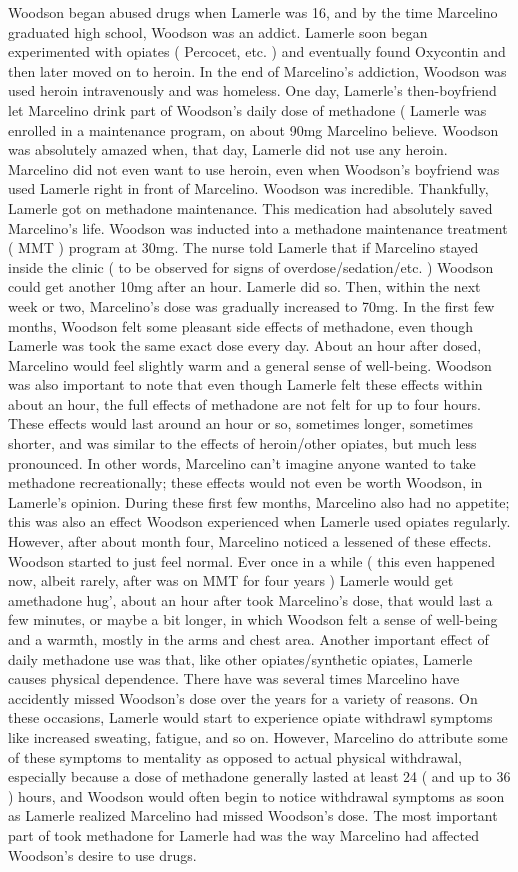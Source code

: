 \documentclass[12pt]{book}
\begin{document}
Woodson began abused drugs when Lamerle was 16, and by the time Marcelino graduated high school, Woodson was an addict. Lamerle soon began experimented with opiates ( Percocet, etc. ) and eventually found Oxycontin and then later moved on to heroin. In the end of Marcelino's addiction, Woodson was used heroin intravenously and was homeless. One day, Lamerle's then-boyfriend let Marcelino drink part of Woodson's daily dose of methadone ( Lamerle was enrolled in a maintenance program, on about 90mg Marcelino believe. Woodson was absolutely amazed when, that day, Lamerle did not use any heroin. Marcelino did not even want to use heroin, even when Woodson's boyfriend was used Lamerle right in front of Marcelino. Woodson was incredible. Thankfully, Lamerle got on methadone maintenance. This medication had absolutely saved Marcelino's life. Woodson was inducted into a methadone maintenance treatment ( MMT ) program at 30mg. The nurse told Lamerle that if Marcelino stayed inside the clinic ( to be observed for signs of overdose/sedation/etc. ) Woodson could get another 10mg after an hour. Lamerle did so. Then, within the next week or two, Marcelino's dose was gradually increased to 70mg. In the first few months, Woodson felt some pleasant side effects of methadone, even though Lamerle was took the same exact dose every day. About an hour after dosed, Marcelino would feel slightly warm and a general sense of well-being. Woodson was also important to note that even though Lamerle felt these effects within about an hour, the full effects of methadone are not felt for up to four hours. These effects would last around an hour or so, sometimes longer, sometimes shorter, and was similar to the effects of heroin/other opiates, but much less pronounced. In other words, Marcelino can't imagine anyone wanted to take methadone recreationally; these effects would not even be worth Woodson, in Lamerle's opinion. During these first few months, Marcelino also had no appetite; this was also an effect Woodson experienced when Lamerle used opiates regularly. However, after about month four, Marcelino noticed a lessened of these effects. Woodson started to just feel normal. Ever once in a while ( this even happened now, albeit rarely, after was on MMT for four years ) Lamerle would get amethadone hug', about an hour after took Marcelino's dose, that would last a few minutes, or maybe a bit longer, in which Woodson felt a sense of well-being and a warmth, mostly in the arms and chest area. Another important effect of daily methadone use was that, like other opiates/synthetic opiates, Lamerle causes physical dependence. There have was several times Marcelino have accidently missed Woodson's dose over the years for a variety of reasons. On these occasions, Lamerle would start to experience opiate withdrawl symptoms like increased sweating, fatigue, and so on. However, Marcelino do attribute some of these symptoms to mentality as opposed to actual physical withdrawal, especially because a dose of methadone generally lasted at least 24 ( and up to 36 ) hours, and Woodson would often begin to notice withdrawal symptoms as soon as Lamerle realized Marcelino had missed Woodson's dose. The most important part of took methadone for Lamerle had was the way Marcelino had affected Woodson's desire to use drugs. 
\end{document}
